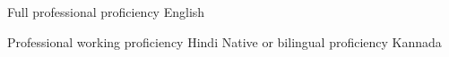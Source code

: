 

\begin{cventries}

  \cventry
    {Full professional proficiency} %
    {English} %
    {} %
    {} %
    {}


      \cventry
    {Professional working proficiency} %
    {Hindi} %
    {} %
    {} %
    {}
      \cventry
    {Native or bilingual proficiency} %
    {Kannada} %
    {} %
    {} %
    {}

\end{cventries}
